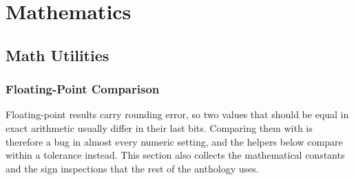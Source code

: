 \chapter{\texorpdfstring{Mathematics}{6. Mathematics}}

\section{\texorpdfstring{Math Utilities}{6.1 Math Utilities}}
\setcounter{section}{1}
\setcounter{subsection}{0}
\subsection{Floating-Point Comparison}
\label{sec:6.1.1}
Floating-point results carry rounding error, so two values that should be equal in exact arithmetic usually differ in their last bits. Comparing them with \inlinecode{==} is therefore a bug in almost every numeric setting, and the helpers below compare within a tolerance instead. This section also collects the mathematical constants and the sign inspections that the rest of the anthology uses.


